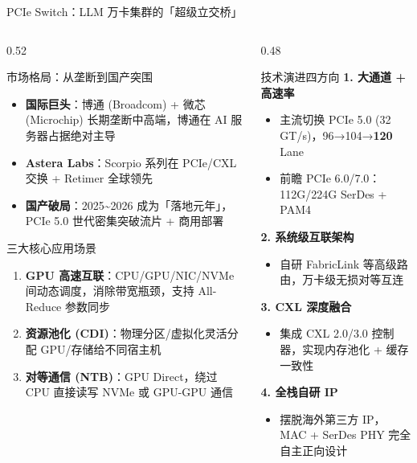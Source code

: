\documentclass[aspectratio=169, 10pt, UTF8]{ctexbeamer}
\begin{document}
\begin{frame}{PCIe Switch：LLM 万卡集群的「超级立交桥」}
  \scriptsize
  \begin{columns}[T]
    \begin{column}{0.52\textwidth}
      \begin{block}{市场格局：从垄断到国产突围}
        \begin{itemize}
          \item \textbf{国际巨头}：博通 (Broadcom) + 微芯 (Microchip) 长期垄断中高端，博通在 AI 服务器占据绝对主导
          \item \textbf{Astera Labs}：Scorpio 系列在 PCIe/CXL 交换 + Retimer 全球领先
          \item \textbf{国产破局}：2025{\textasciitilde}2026 成为「落地元年」，PCIe 5.0 世代密集突破流片 + 商用部署
        \end{itemize}
      \end{block}
      \begin{alertblock}{三大核心应用场景}
        \begin{enumerate}
          \item \textbf{GPU 高速互联}：CPU/GPU/NIC/NVMe 间动态调度，消除带宽瓶颈，支持 All-Reduce 参数同步
          \item \textbf{资源池化 (CDI)}：物理分区/虚拟化灵活分配 GPU/存储给不同宿主机
          \item \textbf{对等通信 (NTB)}：GPU Direct，绕过 CPU 直接读写 NVMe 或 GPU-GPU 通信
        \end{enumerate}
      \end{alertblock}
    \end{column}
    \begin{column}{0.48\textwidth}
      \begin{exampleblock}{技术演进四方向}
        \textbf{1. 大通道 + 高速率}
        \begin{itemize}
          \item 主流切换 PCIe 5.0 (32 GT/s)，96→104→\textbf{120} Lane
          \item 前瞻 PCIe 6.0/7.0：112G/224G SerDes + PAM4
        \end{itemize}
        \textbf{2. 系统级互联架构}
        \begin{itemize}
          \item 自研 FabricLink 等高级路由，万卡级无损对等互连
        \end{itemize}
        \textbf{3. CXL 深度融合}
        \begin{itemize}
          \item 集成 CXL 2.0/3.0 控制器，实现内存池化 + 缓存一致性
        \end{itemize}
        \textbf{4. 全栈自研 IP}
        \begin{itemize}
          \item 摆脱海外第三方 IP，MAC + SerDes PHY 完全自主正向设计
        \end{itemize}
      \end{exampleblock}
    \end{column}
  \end{columns}
\end{frame}
\end{document}
